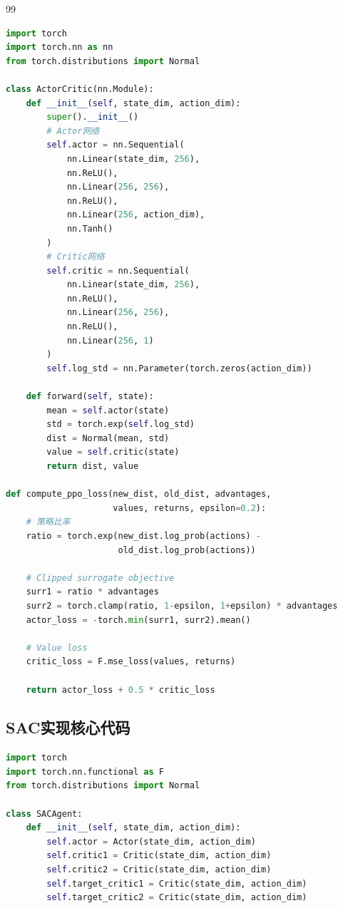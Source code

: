 \documentclass[12pt,a4paper]{ctexart}
\begin{document}
\begin{thebibliography}{99}
\begin{lstlisting}[language=python, caption=PPO核心实现]
import torch
import torch.nn as nn
from torch.distributions import Normal

class ActorCritic(nn.Module):
    def __init__(self, state_dim, action_dim):
        super().__init__()
        # Actor网络
        self.actor = nn.Sequential(
            nn.Linear(state_dim, 256),
            nn.ReLU(),
            nn.Linear(256, 256),
            nn.ReLU(),
            nn.Linear(256, action_dim),
            nn.Tanh()
        )
        # Critic网络
        self.critic = nn.Sequential(
            nn.Linear(state_dim, 256),
            nn.ReLU(),
            nn.Linear(256, 256),
            nn.ReLU(),
            nn.Linear(256, 1)
        )
        self.log_std = nn.Parameter(torch.zeros(action_dim))
    
    def forward(self, state):
        mean = self.actor(state)
        std = torch.exp(self.log_std)
        dist = Normal(mean, std)
        value = self.critic(state)
        return dist, value

def compute_ppo_loss(new_dist, old_dist, advantages, 
                     values, returns, epsilon=0.2):
    # 策略比率
    ratio = torch.exp(new_dist.log_prob(actions) - 
                      old_dist.log_prob(actions))
    
    # Clipped surrogate objective
    surr1 = ratio * advantages
    surr2 = torch.clamp(ratio, 1-epsilon, 1+epsilon) * advantages
    actor_loss = -torch.min(surr1, surr2).mean()
    
    # Value loss
    critic_loss = F.mse_loss(values, returns)
    
    return actor_loss + 0.5 * critic_loss
\end{lstlisting}

\subsection{SAC实现核心代码}

\begin{lstlisting}[language=python, caption=SAC核心实现]
import torch
import torch.nn.functional as F
from torch.distributions import Normal

class SACAgent:
    def __init__(self, state_dim, action_dim):
        self.actor = Actor(state_dim, action_dim)
        self.critic1 = Critic(state_dim, action_dim)
        self.critic2 = Critic(state_dim, action_dim)
        self.target_critic1 = Critic(state_dim, action_dim)
        self.target_critic2 = Critic(state_dim, action_dim)
        

\end{lstlisting}
\end{thebibliography}
\end{document}
